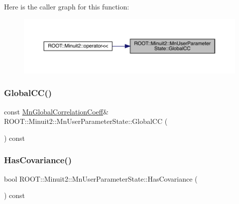 Here is the caller graph for this function\+:\nopagebreak
\begin{figure}[H]
\begin{center}
\leavevmode
\includegraphics[width=350pt]{d3/de0/classROOT_1_1Minuit2_1_1MnUserParameterState_a92905c9d64bbd5367b339826ca358ee8_icgraph}
\end{center}
\end{figure}
\mbox{\label{classROOT_1_1Minuit2_1_1MnUserParameterState_a92905c9d64bbd5367b339826ca358ee8}} 
\subsubsection{\texorpdfstring{GlobalCC()}{GlobalCC()}\hspace{0.1cm}{\footnotesize\ttfamily [2/2]}}
{\footnotesize\ttfamily const \mbox{\hyperlink{classROOT_1_1Minuit2_1_1MnGlobalCorrelationCoeff}{Mn\+Global\+Correlation\+Coeff}}\& R\+O\+O\+T\+::\+Minuit2\+::\+Mn\+User\+Parameter\+State\+::\+Global\+CC (\begin{DoxyParamCaption}{ }\end{DoxyParamCaption}) const\hspace{0.3cm}{\ttfamily [inline]}}

\mbox{\label{classROOT_1_1Minuit2_1_1MnUserParameterState_ae2a189c702627adba401bd2654a04254}} 
\subsubsection{\texorpdfstring{HasCovariance()}{HasCovariance()}\hspace{0.1cm}{\footnotesize\ttfamily [1/2]}}
{\footnotesize\ttfamily bool R\+O\+O\+T\+::\+Minuit2\+::\+Mn\+User\+Parameter\+State\+::\+Has\+Covariance (\begin{DoxyParamCaption}{ }\end{DoxyParamCaption}) const\hspace{0.3cm}{\ttfamily [inline]}}

